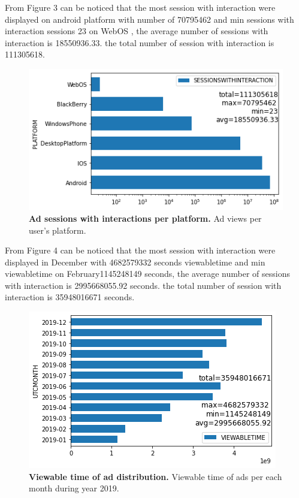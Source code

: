 \documentclass[fleqn,moreauthors,10pt]{ds_report}
\begin{document}
From Figure 3 can be noticed that the most session with interaction were displayed on android platform with number of 70795462 and  min sessions with interaction sessions 23 on WebOS , the average number of sessions with interaction is 18550936.33. the total number of session with interaction is 111305618.
\begin{figure}\centering
	\includegraphics[width=\linewidth]{PlatformUsage.png}
	\caption{\textbf{Ad sessions with interactions per platform.} Ad views per user's platform.}
	\label{fig:column}
\end{figure}
From Figure 4 can be noticed that the most session with interaction were displayed in December with 4682579332  seconds viewabletime and min viewabletime on February1145248149 seconds, the average number of sessions with interaction is 2995668055.92 seconds. the total number of session with interaction is 35948016671 seconds.
\begin{figure}\centering
	\includegraphics[width=\linewidth]{ViewableTime2019.png}
	\caption{\textbf{Viewable time of ad distribution.} Viewable time of ads per each month during year 2019.}
	\label{fig:column}
\end{figure}
\end{document}
